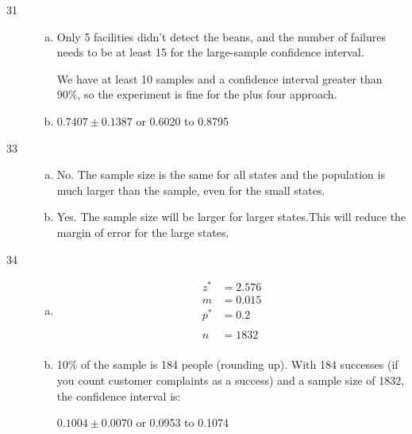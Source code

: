 \documentclass[letterpaper]{exam}
\begin{document}
\begin{description}
\begin{enumerate}[(a)]
\begin{enumerate}[(a)]
            \end{enumerate}
        \end{enumerate}

      \item[31]
        \begin{enumerate}[(a)]
          \item Only 5 facilities didn't detect the beans, and the number of failures
            needs to be at least 15 for the large-sample confidence interval.

            We have at least 10 samples and a confidence interval greater than 90\%, so
            the experiment is fine for the plus four approach.

          \item $0.7407 \pm 0.1387$ or 0.6020 to 0.8795
        \end{enumerate}

      \item[33]
        \begin{enumerate}[(a)]
          \item No. The sample size is the same for all states and the population is
            much larger than the sample, even for the small states.

          \item Yes. The sample size will be larger for larger states.This will
            reduce the margin of error for the large states.
        \end{enumerate}

      \item[34]
        \begin{enumerate}[(a)]
          \item 
            \begin{align*}
              z^* & = 2.576 \\
              m   & = 0.015 \\
              p^* & = 0.2 \\
              \\
              n &= \boxed{ 1832 } \\
            \end{align*}

          \item 10\% of the sample is 184 people (rounding up). With 184 successes
            (if you count customer complaints as a success)
            and a sample size of 1832, the confidence interval is:

            $0.1004 \pm 0.0070$ or 0.0953 to 0.1074


\end{enumerate}
\end{description}
\end{document}
